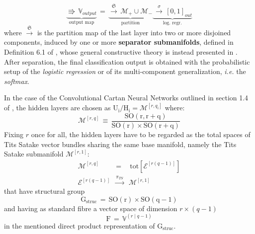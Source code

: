 \documentclass[10pt,a4paper]{article}
\begin{document}
\begin{equation}\label{rimasuglio}
 \underbrace{\boldsymbol{\Rrightarrow} \, \mathbb{V}_{output}}_{\text{output map}} \, = \,  \underbrace{\stackrel{\mathfrak{S}}{\longrightarrow}\, \mathcal{M}_+\cup \mathcal{M}_-}_{\text{partition}} \underbrace{\, \stackrel{\sigma}{\longrightarrow}\,\left[0,1\right]_{out}}_{\text{log. regr.}}
\end{equation}
where $\stackrel{\mathfrak{S}}{\longrightarrow}$ is the partition map of the last layer  into two or more disjoined components, induced by one or more \textbf{separator submanifolds},  defined in Definition 6.1 of \cite{TSnaviga}, whose general constructive theory is  instead presented in \cite{tassellandum}. After separation, the final classification output is obtained with the probabilistic setup of the \textit{logistic regression} or of its multi-component generalization, \textit{i.e.} the \textit{softmax}.
\par
In the case of the Convolutional Cartan Neural Networks outlined in section 1.4 of \cite{tassellandum}, the hidden layers are chosen as  $\mathrm{U_i/H_i}=\mathcal{M}^{[r,q_i]}$ where:
\begin{equation}\label{titstot}
  \mathcal{M}^{[r,q]}\, \equiv \,\frac{\mathrm{SO(r,r+q)}}{\mathrm{SO(r) \times SO(r+q)}}
\end{equation}
Fixing $r$ once for all, the hidden layers have to be regarded as the total spaces of Tits Satake vector bundles sharing the same base manifold, namely the Tits Satake submanifold $\mathcal{M}^{[r,1]}$:
\begin{eqnarray}\label{carneadtwo}
\mathcal{M}^{[r,q]}& = & \,\text{tot}\left[\mathcal{E}^{[r(q-1)]}\right] \nonumber\\
\mathcal{E}^{[r(q-1)]} & \stackrel{\pi_{TS}}{{ \longrightarrow}}& \mathcal{M}^{[r,1]}
\end{eqnarray}
that have structural group
\begin{equation}\label{carneadstruc}
  \mathrm{G_{struc}} \, = \, \mathrm{SO(r)\times SO(q-1)}
\end{equation}
and having as standard fibre a vector space of dimension $r\times (q-1)$
\begin{equation}\label{carneadthree}
  \mathrm{F}  \, = \, \mathbb{V}^{(r\mid q-1)}
\end{equation}
in the mentioned direct product representation of $\mathrm{G_{struc}}$.
\par
\end{document}
